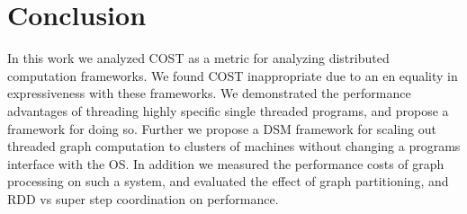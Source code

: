 \section{Conclusion}
\label{sec:conclusion}

In this work we analyzed COST as a metric for analyzing distributed
computation frameworks. We found COST inappropriate due to an
en equality in expressiveness with these frameworks. We demonstrated the
performance advantages of threading highly specific single threaded
programs, and propose a framework for doing so. Further we propose a
DSM framework for scaling out threaded graph computation to clusters
of machines without changing a programs interface with the OS. In
addition we measured the performance costs of graph processing on such
a system, and evaluated the effect of graph partitioning, and RDD vs
super step coordination on performance.


